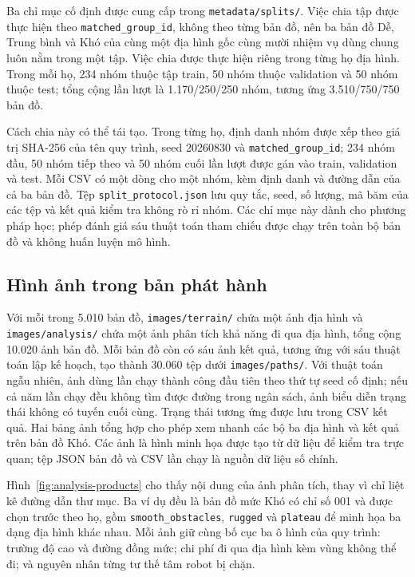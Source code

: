 \documentclass[11pt]{article}
\begin{document}
Ba chỉ mục cố định được cung cấp trong \texttt{metadata/splits/}. Việc chia tập
được thực hiện theo \texttt{matched\_group\_id}, không theo từng bản đồ, nên ba
bản đồ Dễ, Trung bình và Khó của cùng một địa hình gốc cùng mười nhiệm vụ
dùng chung luôn nằm trong một tập. Việc chia được thực hiện riêng trong từng họ địa hình.
Trong mỗi họ, 234 nhóm thuộc tập train, 50 nhóm thuộc validation và 50 nhóm
thuộc test; tổng cộng lần lượt là 1.170/250/250 nhóm, tương ứng
3.510/750/750 bản đồ.

Cách chia này có thể tái tạo. Trong từng họ, định danh nhóm được xếp theo giá trị
SHA-256 của tên quy trình, seed 20260830 và
\texttt{matched\_group\_id}; 234 nhóm đầu, 50 nhóm tiếp theo và 50 nhóm cuối lần
lượt được gán vào train, validation và test. Mỗi CSV có một dòng cho một nhóm,
kèm định danh và đường dẫn của cả ba bản đồ. Tệp
\texttt{split\_protocol.json} lưu quy tắc, seed, số lượng, mã băm của các tệp và
kết quả kiểm tra không rò rỉ nhóm. Các chỉ mục này dành cho phương pháp học;
phép đánh giá sáu thuật toán tham chiếu được chạy trên toàn bộ bản đồ và không huấn luyện
mô hình.

\subsection{Hình ảnh trong bản phát hành}

Với mỗi trong 5.010 bản đồ, \texttt{images/terrain/} chứa một ảnh địa hình và
\texttt{images/analysis/} chứa một ảnh phân tích khả năng đi qua địa hình, tổng cộng
10.020 ảnh bản đồ. Mỗi bản đồ còn có sáu ảnh kết quả, tương ứng với sáu thuật
toán lập kế hoạch, tạo thành 30.060 tệp dưới \texttt{images/paths/}. Với thuật
toán ngẫu nhiên, ảnh dùng lần chạy thành công đầu tiên theo thứ tự seed cố định;
nếu cả năm lần chạy đều không tìm được đường trong ngân sách, ảnh biểu diễn
trạng thái không có tuyến cuối cùng. Trạng thái tương ứng được lưu trong CSV
kết quả. Hai bảng ảnh tổng hợp cho phép xem nhanh các bộ ba địa hình và
kết quả trên bản đồ Khó. Các ảnh là hình minh họa được tạo từ dữ liệu để kiểm tra trực quan; tệp
JSON bản đồ và CSV lần chạy là nguồn dữ liệu số chính.

Hình~\ref{fig:analysis-products} cho thấy nội dung của ảnh phân tích, thay vì
chỉ liệt kê đường dẫn thư mục. Ba ví dụ đều là bản đồ mức Khó có chỉ số 001 và
được chọn trước theo họ, gồm \texttt{smooth\_obstacles}, \texttt{rugged} và
\texttt{plateau} để minh họa ba dạng địa hình khác nhau. Mỗi ảnh giữ cùng bố
cục ba ô hình của quy trình: trường độ cao và đường đồng mức; chi phí đi qua địa hình kèm vùng không thể đi;
và nguyên nhân từng tư thế tâm robot bị chặn.
\end{document}
